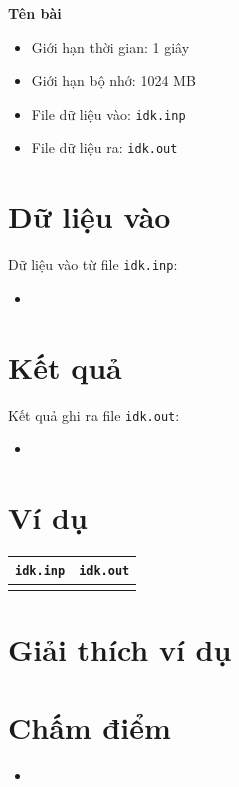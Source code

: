 \documentclass[11pt,a4paper]{article}
\begin{document}
\vspace{0.4em}

{\huge\bfseries Tên bài}

\vspace{-0.01em}

\begin{itemize}[leftmargin=1.5em, topsep=0pt, itemsep=2pt]
    \item Giới hạn thời gian: 1 giây
    \item Giới hạn bộ nhớ: 1024 MB
    \item File dữ liệu vào: \texttt{idk.inp}
    \item File dữ liệu ra: \texttt{idk.out}
\end{itemize}

\section*{Dữ liệu vào}

Dữ liệu vào từ file \texttt{idk.inp}:

\begin{itemize}
    \item 
\end{itemize}

\section*{Kết quả}

Kết quả ghi ra file \texttt{idk.out}:

\begin{itemize}
    \item 
\end{itemize}

\section*{Ví dụ}

\begin{center}
\setlength{\tabcolsep}{10pt}

\begin{tabular}{|p{}|p{}|}
    \hline
    \centering\texttt{idk.inp} & \centering\texttt{idk.out} \tabularnewline
    \hline

    {\ttfamily
    \par
    }
    &
    {\ttfamily 
    \par
    }
    \\[0.5em]

    \hline
\end{tabular}

\end{center}

\section*{Giải thích ví dụ}

\section*{Chấm điểm}

\begin{itemize}
    \item 
\end{itemize}
\end{document}
